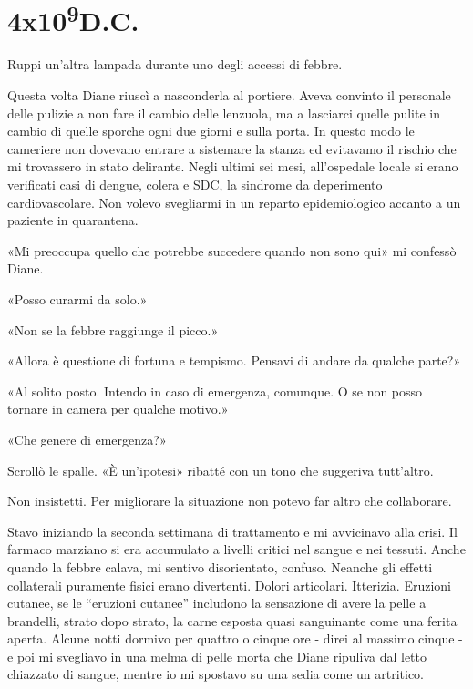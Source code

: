 \chapter{4x10\textsuperscript{9}D.C.}\label{4x10^9-2}

\hfill\break

Ruppi un'altra lampada durante uno degli accessi di febbre.

Questa volta Diane riuscì a nasconderla al portiere. Aveva convinto il
personale delle pulizie a non fare il cambio delle lenzuola, ma a
lasciarci quelle pulite in cambio di quelle sporche ogni due giorni e
sulla porta. In questo modo le cameriere non dovevano entrare a
sistemare la stanza ed evitavamo il rischio che mi trovassero in stato
delirante. Negli ultimi sei mesi, all'ospedale locale si erano
verificati casi di dengue, colera e SDC, la sindrome da deperimento
cardiovascolare. Non volevo svegliarmi in un reparto epidemiologico
accanto a un paziente in quarantena.

«Mi preoccupa quello che potrebbe succedere quando non sono qui» mi
confessò Diane.

«Posso curarmi da solo.»

«Non se la febbre raggiunge il picco.»

«Allora è questione di fortuna e tempismo. Pensavi di andare da qualche
parte?»

«Al solito posto. Intendo in caso di emergenza, comunque. O se non posso
tornare in camera per qualche motivo.»

«Che genere di emergenza?»

Scrollò le spalle. «È un'ipotesi» ribatté con un tono che suggeriva
tutt'altro.

\separatorefiori

Non insistetti. Per migliorare la situazione non potevo far altro che
collaborare.

Stavo iniziando la seconda settimana di trattamento e mi avvicinavo alla
crisi. Il farmaco marziano si era accumulato a livelli critici nel
sangue e nei tessuti. Anche quando la febbre calava, mi sentivo
disorientato, confuso. Neanche gli effetti collaterali puramente fisici
erano divertenti. Dolori articolari. Itterizia. Eruzioni cutanee, se le
``eruzioni cutanee'' includono la sensazione di avere la pelle a
brandelli, strato dopo strato, la carne esposta quasi sanguinante come
una ferita aperta. Alcune notti dormivo per quattro o cinque ore - direi
al massimo cinque - e poi mi svegliavo in una melma di pelle morta che
Diane ripuliva dal letto chiazzato di sangue, mentre io mi spostavo su
una sedia come un artritico.

